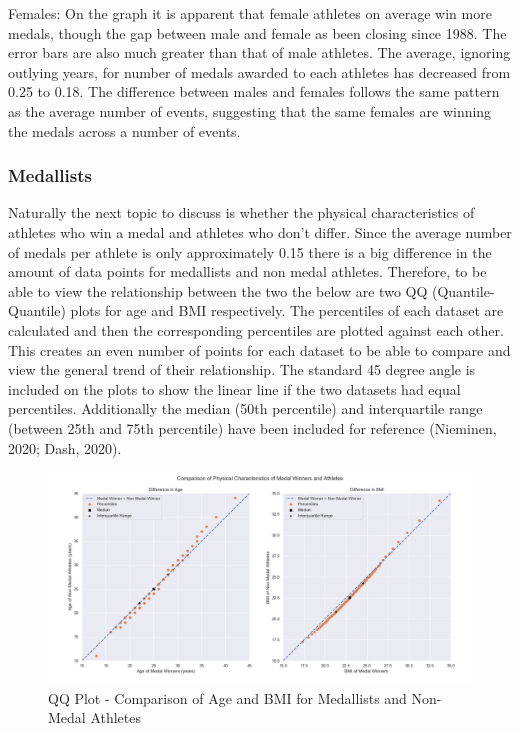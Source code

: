 \documentclass[a4 paper, 12pt]{article}
\begin{document}
        Females: On the graph it is apparent that female athletes on average win more medals, though the gap between male and female as been closing since 1988. The error bars are also much greater than that of male athletes. The average, ignoring outlying years, for number of medals awarded to each athletes has decreased from 0.25 to 0.18. The difference between males and females follows the same pattern as the average number of events, suggesting that the same females are winning the medals across a number of events. 

        \subsubsection{Medallists}
        Naturally the next topic to discuss is whether the physical characteristics of athletes who win a medal and athletes who don't differ. Since the average number of medals per athlete is only approximately 0.15 there is a big difference in the amount of data points for medallists and non medal athletes. Therefore, to be able to view the relationship between the two the below are two QQ (Quantile-Quantile) plots for age and BMI respectively. The percentiles of each dataset are calculated and then the corresponding percentiles are plotted against each other. This creates an even number of points for each dataset to be able to compare and view the general trend of their relationship. The standard 45 degree angle is included on the plots to show the linear line if the two datasets had equal percentiles. Additionally the median (50th percentile) and interquartile range (between 25th and 75th percentile) have been included for reference (Nieminen, 2020; Dash, 2020).
        \begin{figure} [H]
            \centering
            \includegraphics[width=\textwidth, frame]
                {./images/graph/athlete_difference_qqplot.png}      
                \caption{QQ Plot - Comparison of Age and BMI for Medallists and Non-Medal Athletes} 
        \end{figure}
        
\end{document}
